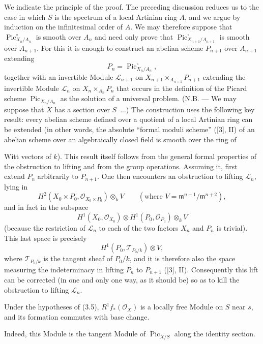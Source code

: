 We indicate the principle of the proof. The preceding discussion reduces us
to the case in which $S$ is the spectrum of a local Artinian ring $A$, and we
argue by induction on the infinitesimal order of $A$. We may therefore suppose
that $\operatorname{Pic}_{X_n/A_n}^\circ$ is smooth over $A_n$ and need only
prove that $\operatorname{Pic}_{X_{n+1}/A_{n+1}}^\circ$ is smooth over
$A_{n+1}$. For this it is enough to construct an abelian scheme $P_{n+1}$ over
$A_{n+1}$ extending
\[
P_n=\operatorname{Pic}_{X_n/A_n}^\circ,
\]
together with an invertible Module $\mathcal L_{n+1}$ on
$X_{n+1}\times_{A_{n+1}}P_{n+1}$ extending the invertible Module
$\mathcal L_n$ on $X_n\times_{A_n}P_n$ that occurs in the definition of the
Picard scheme $\operatorname{Pic}_{X_n/A_n}$ as the solution of a universal
problem. (N.B. --- We may suppose that $X$ has a section over $S$~...) The
construction uses the following key result: every abelian scheme defined over
a quotient of a local Artinian ring can be extended (in other words, the
absolute “formal moduli scheme” ([3], II) of an abelian scheme over an
algebraically closed field is smooth over the ring of

Witt vectors of $k$). This result itself follows from the general formal
properties of the obstruction to lifting and from the group operations.
Assuming it, first extend $P_n$ arbitrarily to $P_{n+1}$. One then encounters
an obstruction to lifting $\mathcal L_n$, lying in
\[
H^2(X_0\times P_0,\mathcal O_{X_0\times P_0})\otimes_k V
\qquad(\text{where }V=\mathfrak m^{n+1}/\mathfrak m^{n+2}),
\]
and in fact in the subspace
\[
H^1(X_0,\mathcal O_{X_0})\otimes
H^1(P_0,\mathcal O_{P_0})\otimes_k V
\]
(because the restriction of $\mathcal L_n$ to each of the two factors $X_n$
and $P_n$ is trivial). This last space is precisely
\[
H^1(P_0,\mathcal T_{P_0/k})\otimes V,
\]
where $\mathcal T_{P_0/k}$ is the tangent sheaf of $P_0/k$, and it is therefore
also the space measuring the indeterminacy in lifting $P_n$ to $P_{n+1}$ ([3],
II). Consequently this lift can be corrected (in one and only one way, as it
should be) so as to kill the obstruction to lifting $\mathcal L_n$.

 Under the hypotheses of (3.5),
$R^1f_*(\mathcal O_X)$ is a locally free Module on $S$ near $s$, and its
formation commutes with base change.

Indeed, this Module is the tangent Module of $\operatorname{Pic}_{X/S}$ along
the identity section.

